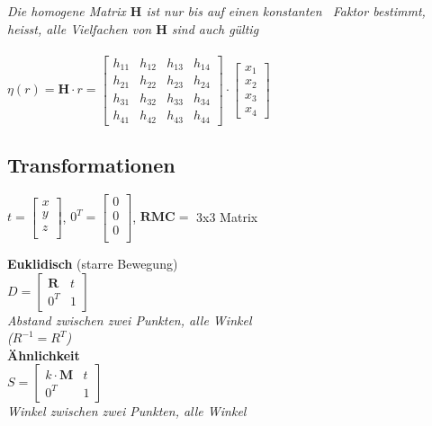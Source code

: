 \textit{Die homogene Matrix $\mathbf{H}$ ist nur bis auf einen konstanten \
 Faktor bestimmt, heisst, alle Vielfachen von $\mathbf{H}$ sind auch gültig} \\

 \\

$\eta(r) = \mathbf{H} \cdot r = \begin{bmatrix}
    h_{11} & h_{12} & h_{13} & h_{14} \\
    h_{21} & h_{22} & h_{23} & h_{24} \\
    h_{31} & h_{32} & h_{33} & h_{34} \\
    h_{41} & h_{42} & h_{43} & h_{44}
\end{bmatrix} \cdot \begin{bmatrix}
    x_1 \\
    x_2 \\
    x_3 \\
    x_4
\end{bmatrix}$

\subsection{Transformationen}

$t=\begin{bmatrix}
    x \\
    y \\
    z \\
\end{bmatrix}$, $0^T = \begin{bmatrix}
    0 \\
    0 \\
    0 \\
\end{bmatrix}$, $\mathbf{RMC} =$ 3x3 Matrix

\textbf{Euklidisch} (starre Bewegung) \\
$D = \begin{bmatrix}
    \mathbf{R} & t \\
    0^T & 1
\end{bmatrix}$ \\
\textit{Abstand zwischen zwei Punkten, alle Winkel} \\
\textit{($R^{-1} = R^T$)} \\

\textbf{Ähnlichkeit} \\
$S = \begin{bmatrix}
    k \cdot \mathbf{M} & t \\
    0^T & 1
\end{bmatrix}$ \\
\textit{Winkel zwischen zwei Punkten, alle Winkel} \\

